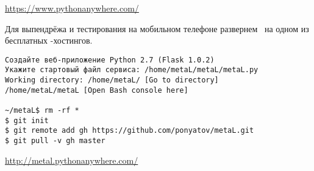 
\url{https://www.pythonanywhere.com/}

\bigskip\noindent
Для выпендрёжа и тестирования на мобильном телефоне развернем \metal\ на одном
из бесплатных \py-хостингов.

\begin{verbatim}
Создайте веб-приложение Python 2.7 (Flask 1.0.2)
Укажите стартовый файл сервиса: /home/metaL/metaL/metaL.py
Working directory: /home/metaL/ [Go to directory]
/home/metaL/metaL [Open Bash console here]

~/metaL$ rm -rf *
$ git init
$ git remote add gh https://github.com/ponyatov/metaL.git
$ git pull -v gh master
\end{verbatim}

\url{http://metal.pythonanywhere.com/}
